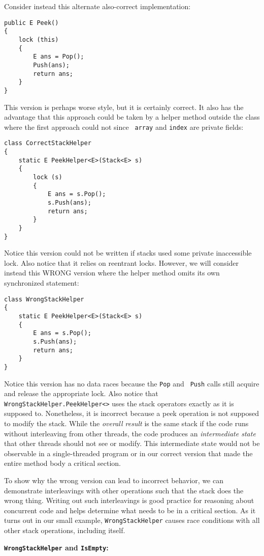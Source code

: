 \documentclass[10pt]{article}
\begin{document}
Consider instead this alternate also-correct implementation:
\begin{verbatim}
public E Peek()
{
    lock (this)
    {
        E ans = Pop();
        Push(ans);
        return ans;
    }
}
\end{verbatim}
This version is perhaps worse style, but it is certainly correct.  It
also has the advantage that this approach could be taken by a helper
method outside the class where the first approach could not since {\tt
  array} and {\tt index} are private fields:
\begin{verbatim}
class CorrectStackHelper
{
    static E PeekHelper<E>(Stack<E> s)
    {
        lock (s)
        {
            E ans = s.Pop();
            s.Push(ans);
            return ans;
        }
    }
}
\end{verbatim}
Notice this version could not be written if stacks used some private
inaccessible lock.  Also notice that it relies on reentrant locks.
However, we will consider instead this WRONG version where the helper
method omits its own synchronized statement:
\begin{verbatim}
class WrongStackHelper
{
    static E PeekHelper<E>(Stack<E> s)
    {
        E ans = s.Pop();
        s.Push(ans);
        return ans;
    }
}
\end{verbatim}
Notice this version has no data races because the {\tt Pop} and {\tt
  Push} calls still acquire and release the appropriate lock.  Also
  notice that {\tt WrongStackHelper.PeekHelper<>} uses the stack operators exactly as
  it is supposed to.  Nonetheless, it is incorrect because
  a peek operation is not supposed to modify the stack.  While
  the \emph{overall result} is the same stack if the code runs without
  interleaving from other threads, the code produces an
  \emph{intermediate state} that other threads should not see or modify.  This
  intermediate state would not be observable in a single-threaded
  program or in our correct version that made the entire method body a
  critical section.

To show why the wrong version can lead to incorrect behavior, we can
demonstrate interleavings with other operations such that the stack
does the wrong thing.  Writing out such interleavings is good practice
for reasoning about concurrent code and helps determine what needs to
be in a critical section.  As it turns out in our small example, 
{\tt WrongStackHelper} causes race conditions with all other stack
operations, including itself.

\medskip
\noindent\textbf{{\tt WrongStackHelper} and {\tt IsEmpty}:}
\medskip
\end{document}
